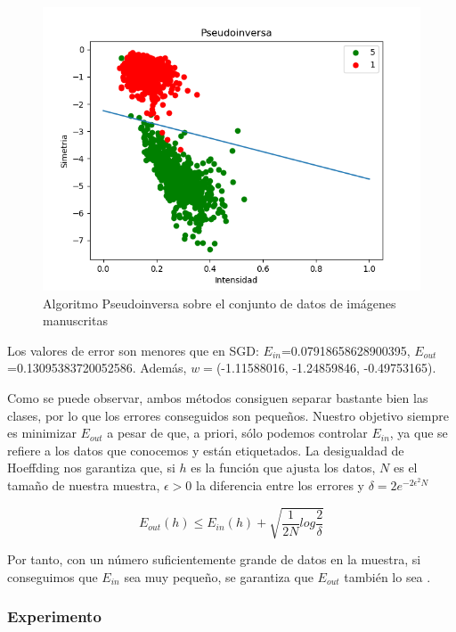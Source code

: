 \begin{figure}[H] %
	\centering
	\includegraphics[scale=0.6]{pseudoinversa.png}  %
	\caption{Algoritmo Pseudoinversa sobre el conjunto de datos de imágenes manuscritas} 
	\label{fig:pseud}
\end{figure}

Los valores de error son menores que en SGD: $E_{in}$=0.07918658628900395, $E_{out}$=0.13095383720052586. Además, $w=$(-1.11588016, -1.24859846, -0.49753165).

Como se puede observar, ambos métodos consiguen separar bastante bien las clases, por lo que los errores conseguidos son pequeños. Nuestro objetivo siempre es minimizar $E_{out}$ a pesar de que, a priori, sólo podemos controlar $E_{in}$, ya que se refiere a los datos que conocemos y están etiquetados. La desigualdad de Hoeffding nos garantiza que, si $h$ es la función que ajusta los datos, $N$ es el tamaño de nuestra muestra, $\epsilon>0$ la diferencia entre los errores y $\delta = 2e^{-2\epsilon^2N}$

$$ E_{out}(h) \leq E_{in}(h) + \sqrt{\frac{1}{2N} log \frac{2}{\delta}}$$

Por tanto, con un número suficientemente grande de datos en la muestra, si conseguimos que $E_{in}$ sea muy pequeño, se garantiza que $E_{out}$ también lo sea \cite{esl}.

\newpage

\subsubsection{Experimento}

